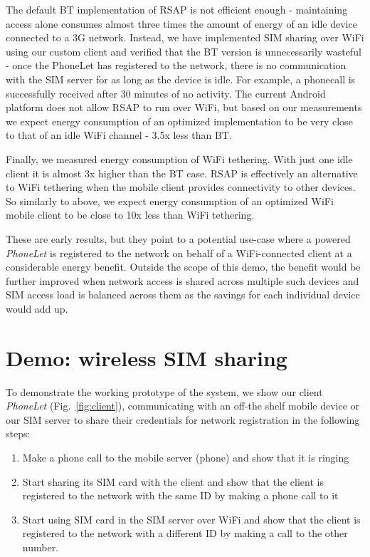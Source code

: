 \documentclass{sig-alternate-2013}
\begin{document}
The default BT implementation of RSAP is not efficient enough - maintaining access alone consumes almost three times the amount of energy of an idle device connected to a 3G network. Instead, we have implemented SIM sharing over WiFi using our custom client and verified that the BT version is unnecessarily wasteful - once the PhoneLet has registered to the network, there is no communication with the SIM server for as long as the device is idle. For example, a phonecall is successfully received after 30 minutes of no activity. The current Android platform does not allow RSAP to run over WiFi, but based on our measurements we expect energy consumption of an optimized implementation to be very close to that of an idle WiFi channel - 3.5x less than BT.

Finally, we measured energy consumption of WiFi tethering. With just one idle client it is almost 3x higher than the BT case. RSAP is effectively an alternative to WiFi tethering when the mobile client provides connectivity to other devices. So similarly to above, we expect energy consumption of an optimized WiFi mobile client to be close to 10x less than WiFi tethering.

These are early results, but they point to a potential use-case where a powered \emph{PhoneLet} is registered to the network on behalf of a WiFi-connected client at a considerable energy benefit. Outside the scope of this demo, the benefit would be further improved when network access is shared across multiple such devices and SIM access load is balanced across them as the savings for each individual device would add up.

\section{Demo: wireless SIM sharing}

To demonstrate the working prototype of the system, we show our client \emph{PhoneLet} (Fig.~\ref{fig:client}), communicating with an off-the shelf mobile device or our SIM server to share their credentials for network registration in the following steps:

\begin{enumerate}
    \item Make a phone call to the mobile server (phone) and show that it is ringing
    \item Start sharing its SIM card with the client and show that the client is registered to the network with the same ID by making a phone call to it
    \item Start using SIM card in the SIM server over WiFi and show that the client is registered to the network with a different ID by making a call to the other number.
\end{enumerate}
\end{document}
